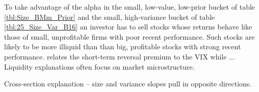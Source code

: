 To take advantage of the alpha in the small, low-value, low-prior bucket of
table \ref{tbl:Size_BMm_Prior} and the small, high-variance bucket of table
\ref{tbl:25_Size_Var_B16} an investor has to sell stocks whose returns behave
like those of small, unprofitable firms with poor recent performance.
Such stocks are likely to be more illiquid than than big, profitable stocks
with strong recent performance.
\textcite{nagel2012evaporating} relates the short-term reversal premium to the
VIX while \textcite{nagel2005short} ...
Liquidity explanations often focus on market microstructure.

Cross-section explanation -- size and variance slopes pull in opposite
directions.

